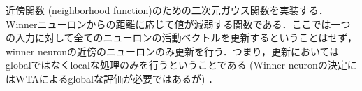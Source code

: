 近傍関数 (neighborhood function)のための二次元ガウス関数を実装する．Winnerニューロンからの距離に応じて値が減弱する関数である．ここでは一つの入力に対して全てのニューロンの活動ベクトルを更新するということはせず，winner neuronの近傍のニューロンのみ更新を行う．つまり，更新においてはglobalではなくlocalな処理のみを行うということである  (Winner neuronの決定にはWTAによるglobalな評価が必要ではあるが) ．

